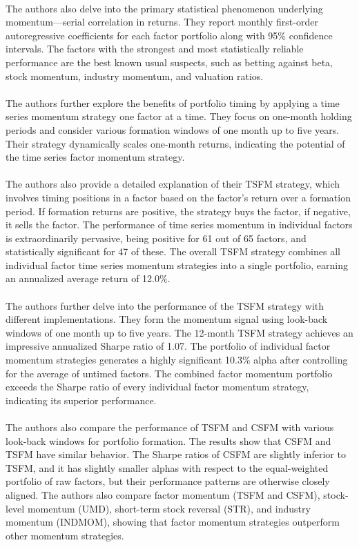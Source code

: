 \documentclass{article}
\begin{document}
\\
The authors also delve into the primary statistical phenomenon underlying momentum—serial correlation in returns. They report monthly first-order autoregressive coefficients for each factor portfolio along with 95\% confidence intervals. The factors with the strongest and most statistically reliable performance are the best known usual suspects, such as betting against beta, stock momentum, industry momentum, and valuation ratios. \\
\\
The authors further explore the benefits of portfolio timing by applying a time series momentum strategy one factor at a time. They focus on one-month holding periods and consider various formation windows of one month up to five years. Their strategy dynamically scales one-month returns, indicating the potential of the time series factor momentum strategy. \\
\\
The authors also provide a detailed explanation of their TSFM strategy, which involves timing positions in a factor based on the factor’s return over a formation period. If formation returns are positive, the strategy buys the factor, if negative, it sells the factor. The performance of time series momentum in individual factors is extraordinarily pervasive, being positive for 61 out of 65 factors, and statistically significant for 47 of these. The overall TSFM strategy combines all individual factor time series momentum strategies into a single portfolio, earning an annualized average return of 12.0\%. \\
\\
The authors further delve into the performance of the TSFM strategy with different implementations. They form the momentum signal using look-back windows of one month up to five years. The 12-month TSFM strategy achieves an impressive annualized Sharpe ratio of 1.07. The portfolio of individual factor momentum strategies generates a highly significant 10.3\% alpha after controlling for the average of untimed factors. The combined factor momentum portfolio exceeds the Sharpe ratio of every individual factor momentum strategy, indicating its superior performance. \\
\\
The authors also compare the performance of TSFM and CSFM with various look-back windows for portfolio formation. The results show that CSFM and TSFM have similar behavior. The Sharpe ratios of CSFM are slightly inferior to TSFM, and it has slightly smaller alphas with respect to the equal-weighted portfolio of raw factors, but their performance patterns are otherwise closely aligned. The authors also compare factor momentum (TSFM and CSFM), stock-level momentum (UMD), short-term stock reversal (STR), and industry momentum (INDMOM), showing that factor momentum strategies outperform other momentum strategies. \\
\end{document}
